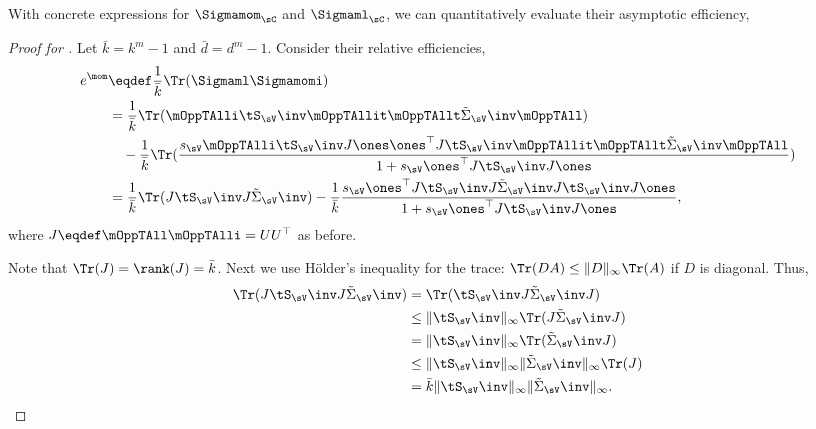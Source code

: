 With concrete expressions for $\Sigmamom_\sC$ and $\Sigmaml_\sC$, we can quantitatively evaluate their asymptotic efficiency,
\begin{proof}[Proof for ]
  Let $\bar k = k^m -1$ and $\bar d = d^m -1$. Consider their relative
  efficiencies, 
  \begin{align*}
    e^\mom 
        &\eqdef \frac{1}{\bar k} \Tr(\Sigmaml\Sigmamomi ) \\
        &= \frac{1}{\bar k} \Tr( \mOppTAlli \tS_\sV\inv \mOppTAllit \mOppTAllt \tilde\Sigma_\sV\inv \mOppTAll ) \\
      &\quad - \frac{1}{\bar k} \Tr( \frac{s_\sV \mOppTAlli \tS_\sV\inv J \ones \ones^\top J \tS_\sV\inv \mOppTAllit \mOppTAllt  \tilde\Sigma_\sV\inv \mOppTAll }
      {1 + s_\sV \ones^\top J \tS_\sV\inv J \ones} ) \\
        &= \frac{1}{\bar k} \Tr( J \tS_\sV\inv J \tilde\Sigma_\sV\inv ) - \frac{1}{\bar k} \frac{s_\sV \ones^\top J \tS_\sV\inv J \tilde\Sigma_\sV\inv J \tS_\sV\inv J \ones }
      {1 + s_\sV \ones^\top J \tS_\sV\inv J \ones},
  \end{align*}
  where $J \eqdef \mOppTAll \mOppTAlli = U U^\top$ as before. 
  
  Note that $\Tr(J) = \rank(J) = {\bar k}$.
  Next we use H\"{o}lder's inequality for the trace: $\Tr(D A) \le
  \|D\|_\infty \Tr(A)$ if $D$ is diagonal. Thus,
  \begin{align*}
      \Tr( J \tS_\sV\inv J \tilde\Sigma_\sV\inv ) 
        &= \Tr( \tS_\sV\inv J \tilde\Sigma_\sV\inv J ) \\
        &\le \|\tS_\sV\inv\|_\infty \Tr( J \tilde\Sigma_\sV\inv J ) \\
        &= \|\tS_\sV\inv\|_\infty \Tr( \tilde\Sigma_\sV\inv J ) \\
        &\le \|\tS_\sV\inv\|_\infty \|\tilde\Sigma_\sV\inv\|_\infty \Tr( J ) \\
        &= {\bar k} \|\tS_\sV\inv\|_\infty \|\tilde\Sigma_\sV\inv\|_\infty.
  \end{align*}


\end{proof}
